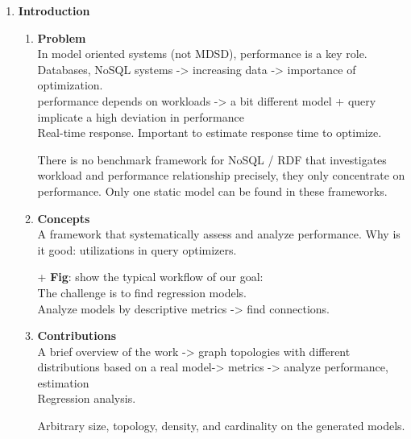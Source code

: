 \newpage
\begin{enumerate}
	\item \textbf{Introduction}
		\begin{enumerate}[label*=\arabic*.]
			\item \textbf{Problem}\\
			In model oriented systems (not MDSD), performance is a key role.
			Databases, NoSQL systems -> increasing data -> importance of optimization.\\
			
			performance depends on workloads -> a bit different model + query implicate a high deviation in performance\\
			Real-time response. Important to estimate response time to optimize.
			
			There is no benchmark framework for NoSQL / RDF that investigates workload and performance relationship precisely, they only concentrate on performance. Only one static model can be found in these frameworks.
			

			\item \textbf{Concepts}\\
			A framework that systematically assess and analyze performance.
			Why is it good: utilizations in query optimizers.
	
			+ \textbf{\textbf{Fig}}: show the typical workflow of our goal: \\
			The challenge is to find regression models. \\
			Analyze models by descriptive metrics -> find connections.
			
			\item \textbf{Contributions}\\
			A brief overview of the work -> graph topologies with different distributions based on a real model-> metrics -> analyze performance, estimation\\
			Regression analysis.
			
			Arbitrary size, topology, density, and cardinality on the generated models.
			

\end{enumerate}
\end{enumerate}
